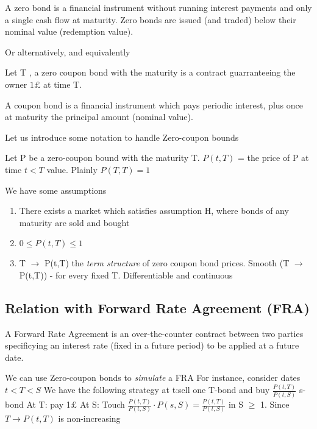 \begin{dfn}
 A zero bond is a financial instrument without running interest payments and only
a single cash flow at maturity. Zero bonds are issued (and traded) below their
nominal value (redemption value).
\end{dfn}
Or alternatively, and equivalently
\begin{dfn}
Let T , a zero coupon bond with the maturity  is a contract guarranteeing the owner 
$1 \pounds$ at time T. 
\end{dfn}
\begin{dfn}A coupon bond is a financial instrument which pays periodic interest, plus
once at maturity the principal amount (nominal value).
\end{dfn}
Let us introduce some notation to handle Zero-coupon bounds 
\begin{dfn}
 Let P be a zero-coupon bound with the maturity T. 
$P(t,T)$ = the price of P at time $t \lt T$ value. Plainly $P(T,T) = 1$
\end{dfn}
We have some assumptions
\begin{rem} 
 \begin{enumerate}
  \item There exists a market which satisfies assumption H, where bonds of any maturity are sold and bought
\item $0 \leq P(t,T) \leq 1$
\item T $\to$ P(t,T) the \textit{term structure} of zero coupon bond prices. Smooth (T $\to$ P(t,T)) - for every
fixed T. Differentiable and continuous
 \end{enumerate}
\end{rem}
\subsection{Relation with Forward Rate Agreement (FRA)} 
\begin{dfn}
 A Forward Rate Agreement is an over-the-counter contract between two parties specificying an interest rate (fixed
in a future period) to be applied at a future date.
\end{dfn}
\begin{rem}
We can use Zero-coupon bonds to \textit{simulate} a FRA
For instance, consider dates $t \lt T \lt S$ 
We have the following strategy at t:sell one T-bond and buy $\frac{P(t,T)}{P(t,S)}$ s-bond
At T: pay 1$\pounds$ 
At S: Touch $\frac{P(t,T)}{P(t,S)}\cdot P(s,S)= \frac{P(t,T)}{P(t,S)}$ in S $\geq$ 1. 
Since $T \to P(t,T)$ is non-increasing
\end{rem}
